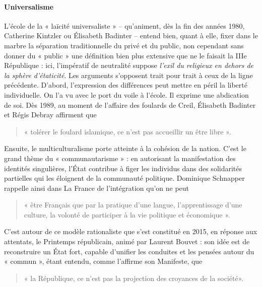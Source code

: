 \paragraph{Universalisme} L’école de la « laïcité universaliste » – qu’animent, dès la fin des années 1980, Catherine Kintzler ou Élisabeth Badinter – entend bien, quant à elle, fixer dans le marbre la séparation traditionnelle du privé et du public, non cependant sans donner du « public » une définition bien plus extensive que ne le faisait la IIIe République : ici, l’impératif de neutralité suppose \textit{l’exil du religieux en dehors de la sphère d’étaticité}. Les arguments s’opposent trait pour trait à ceux de la ligne précédente. D’abord, l’expression des différences peut mettre en péril la liberté individuelle. On l’a vu avec le port du voile à l’école. Il exprime une abdication de soi. Dès 1989, au moment de l’affaire des foulards de Creil, Élisabeth Badinter et Régis Debray affirment que \begin{quote}
« tolérer le foulard islamique, ce n’est pas accueillir un être libre ».     
\end{quote}
Ensuite, le multiculturalisme porte atteinte à la cohésion de la nation. C’est le grand thème du « communautarisme » : en autorisant la manifestation des identités singulières, l’État contribue à figer les individus dans des solidarités partielles qui les éloignent de
la communauté politique. Dominique Schnapper rappelle ainsi dans La France de l’intégration qu’on ne peut 
\begin{quote}
« être Français que par la pratique d’une langue, l’apprentissage d’une culture, la volonté de participer à la vie politique et économique ».     
\end{quote}
C’est autour de ce modèle rationaliste que s’est constitué en 2015, en réponse aux attentats, le Printemps républicain, animé par Laurent Bouvet : son idée est de reconstruire un État fort, capable d’unifier les conduites et les pensées autour du « commun », étant entendu, comme l’affirme son Manifeste, que 
\begin{quote}
« la République, ce n’est pas la projection des croyances de la société».
    
\end{quote}

